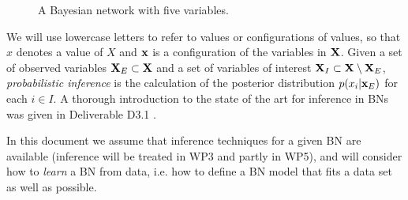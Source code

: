 \begin{figure}[htb]
  \begin{center}
   \scalebox{1}{
    \begin{tikzpicture}

    \simpleModel
    \end{tikzpicture}
    }
  \end{center}
  \caption{A Bayesian network with five variables.}
  \label{fig:sampleBN}
\end{figure}


We will use lowercase letters to refer to
values or configurations of values, so that $x$ denotes a value of $X$ and $\bx$ is a configuration of the
variables in $\bX$. 
Given a set of observed variables $\bX_E\subset \bX$ and a set of variables of interest $\bX_I\subset \bX \setminus \bX_E$,
\emph{probabilistic inference} is the calculation  of the posterior distribution
$p(x_i|\bx_E)$ for each $i\in I$. 
A thorough introduction to the state of the art for inference in BNs was given in Deliverable D3.1 \cite{AMIDST-D31}. 

In this document we assume that inference techniques for a given BN are available (inference will be treated in
WP3 and partly in WP5), and will consider how to 
\textit{learn} a BN from data, i.e. how to define a BN model that fits a data set as well as possible.



